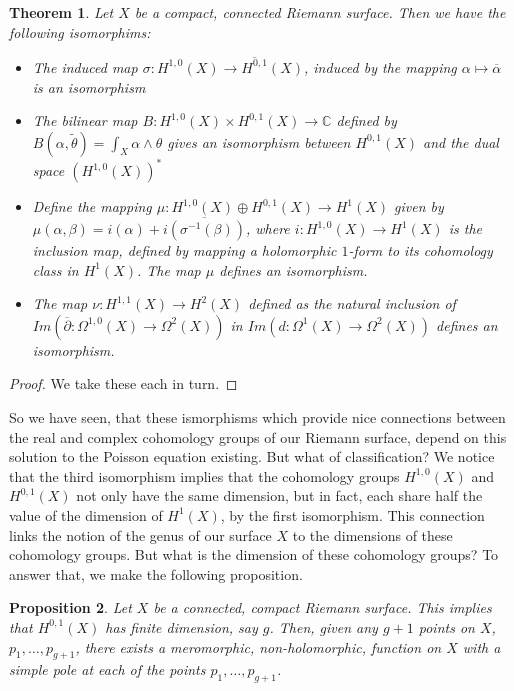 \documentclass[11pt]{report}
\newtheorem{thm}{Theorem}[section]
\newtheorem{prop}[thm]{Proposition}
\theoremstyle{definition}
\begin{document}
\begin{thm}
  Let $X$ be a compact, connected Riemann surface. Then we have the following isomorphims:
  \begin{itemize}
    \item The induced map $\sigma: H^{1,0}(X) \rightarrow \overline{H^{0,1}}(X)$, induced by the mapping $\alpha \mapsto \overline{\alpha}$ is an isomorphism
    \item The bilinear map $B:H^{1,0}(X)\times H^{0,1}(X) \rightarrow \mathbb{C}$ defined by $B(\alpha, \tilde{\theta})=\int_X \alpha \wedge \theta$ gives an isomorphism between $H^{0,1}(X)$ and the dual space $(H^{1,0}(X))^*$
    \item Define the mapping $\mu:H^{1,0}(X) \oplus H^{0,1}(X) \rightarrow H^1(X)$ given by $\mu(\alpha, \beta) = i(\alpha) + \overline{i(\sigma^{-1}(\beta))}$, where $i:H^{1,0}(X) \rightarrow H^1(X)$ is the inclusion map, defined by mapping a holomorphic $1$-form to its cohomology class in $H^1(X)$. The map $\mu$ defines an isomorphism.
    \item The map $\nu:H^{1,1}(X) \rightarrow H^2(X)$ defined as the natural inclusion of $Im(\overline{\partial}:\Omega^{1,0}(X)\rightarrow \Omega^2(X))$ in $Im(d:\Omega^1(X)\rightarrow \Omega^2(X))$ defines an isomorphism.
  \end{itemize}
\end{thm}
\begin{proof}
  We take these each in turn.
\end{proof}
So we have seen, that these ismorphisms which provide nice connections between the real and complex cohomology groups of our Riemann surface, depend on this solution to the Poisson equation existing. But what of classification? We notice that the third isomorphism implies that the cohomology groups $H^{1,0}(X)$ and $H^{0,1}(X)$ not only have the same dimension, but in fact, each share half the value of the dimension of $H^1(X)$, by the first isomorphism. This connection links the notion of the genus of our surface $X$ to the dimensions of these cohomology groups. But what is the dimension of these cohomology groups? To answer that, we make the following proposition.
\begin{prop}
  Let $X$ be a connected, compact Riemann surface. This implies that $H^{0,1}(X)$ has finite dimension, say $g$. Then, given any $g+1$ points on $X$, $p_1,\ldots, p_{g+1}$, there exists a meromorphic, non-holomorphic, function on $X$ with a simple pole at each of the points $p_1,\ldots, p_{g+1}$.
\end{prop} 
\end{document}
